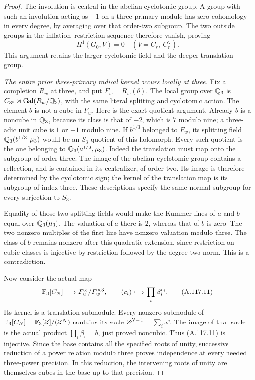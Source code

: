 \begin{proof}
The involution is central in the abelian cyclotomic group.
A group with such an involution acting as \(-1\) on a
three-primary module has zero cohomology in every degree,
by averaging over that order-two subgroup.
The two outside groups in the inflation--restriction
sequence therefore vanish, proving
\[
                         H^1(G_0,V)=0
                    \quad(V=C_r,\ C_r^\vee).
 \tag{A.117.10}
\]
This argument retains the larger cyclotomic field and the
deeper translation group.

\emph{The entire prior three-primary radical kernel occurs locally at three.}
Fix a completion \(R_w\) at three, and put
\(F_w=R_w(\theta)\).
The local group over \(\mathbb Q_3\) is
\(C_{3^t}\rtimes\operatorname{Gal}(R_w/\mathbb Q_3)\), with
the same literal splitting and cyclotomic action.
The element \(b\) is not a cube in \(F_w\).
Here is the exact quotient argument.
Already \(b\) is a noncube in \(\mathbb Q_3\), because its class
is that of \(-2\), which is \(7\) modulo nine; a
three-adic unit cube is \(1\) or \(-1\) modulo nine.
If \(b^{1/3}\) belonged to \(F_w\), its splitting field
\(\mathbb Q_3(b^{1/3},\mu_3)\) would be an \(S_3\) quotient
of this holomorph.
Every such quotient is the one belonging to
\(\mathbb Q_3(a^{1/3},\mu_3)\).
Indeed the translation must map onto the subgroup of
order three.  The image of the abelian cyclotomic group
contains a reflection, and is contained in its
centralizer, of order two.  Its image is therefore
determined by the cyclotomic sign; the kernel of the
translation map is its subgroup of index three.
These descriptions specify the same normal subgroup
for every surjection to \(S_3\).

Equality of those two splitting fields would make the
Kummer lines of \(a\) and \(b\) equal over \(\mathbb Q_3(\mu_3)\).
The valuation of \(a\) there is \(2\), whereas that
of \(b\) is zero.  The two nonzero multiples of the
first line have nonzero valuation modulo three.
The class of \(b\) remains nonzero after this quadratic
extension, since restriction on cubic classes is
injective by restriction followed by the degree-two norm.
This is a contradiction.

Now consider the actual map
\[
 \mathbb F_3[C_N]\longrightarrow F_w^\times/F_w^{\times3},
          \qquad (c_i)\longmapsto\prod_i\beta_i^{c_i}.
 \tag{A.117.11}
\]
Its kernel is a translation submodule.
Every nonzero submodule of
\(\mathbb F_3[C_N]=\mathbb F_3[Z]/(Z^N)\) contains its socle
\(Z^{N-1}=\sum_i x^i\).
The image of that socle is the actual product
\(\prod_i\beta_i=b\), just proved noncubic.
Thus (A.117.11) is injective.
Since the base contains all the specified roots of
unity, successive reduction of a power relation modulo
three proves independence at every needed three-power
precision.  In this reduction, the intervening roots
of unity are themselves cubes in the base up to that
precision.


\end{proof}
